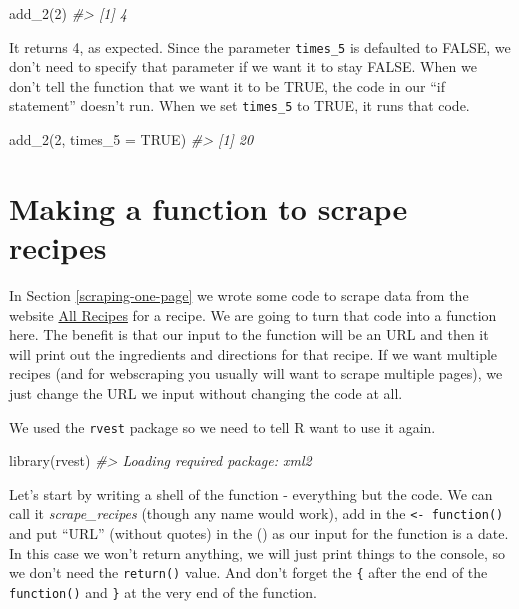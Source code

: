 \documentclass[
  12pt,
]{book}
\newenvironment{Shaded}{\begin{snugshade}}{\end{snugshade}}
\newcommand{\AttributeTok}[1]{\textcolor[rgb]{0.61,0.61,0.61}{#1}}
\newcommand{\CommentTok}[1]{\textcolor[rgb]{0.37,0.37,0.37}{\textit{#1}}}
\newcommand{\ConstantTok}[1]{\textcolor[rgb]{0,0,0}{#1}}
\newcommand{\DecValTok}[1]{\textcolor[rgb]{0.06,0.06,0.06}{#1}}
\newcommand{\FunctionTok}[1]{\textcolor[rgb]{0,0,0}{#1}}
\newcommand{\NormalTok}[1]{#1}
\begin{document}
\begin{Shaded}
\begin{Highlighting}[]
\FunctionTok{add\_2}\NormalTok{(}\DecValTok{2}\NormalTok{)}
\CommentTok{\#\textgreater{} [1] 4}
\end{Highlighting}
\end{Shaded}

It returns 4, as expected. Since the parameter \texttt{times\_5} is defaulted to FALSE, we don't need to specify that parameter if we want it to stay FALSE. When we don't tell the function that we want it to be TRUE, the code in our ``if statement'' doesn't run. When we set \texttt{times\_5} to TRUE, it runs that code.

\begin{Shaded}
\begin{Highlighting}[]
\FunctionTok{add\_2}\NormalTok{(}\DecValTok{2}\NormalTok{, }\AttributeTok{times\_5 =} \ConstantTok{TRUE}\NormalTok{)}
\CommentTok{\#\textgreater{} [1] 20}
\end{Highlighting}
\end{Shaded}

\hypertarget{recipes-function}{%
\section{Making a function to scrape recipes}\label{recipes-function}}

In Section \ref{scraping-one-page} we wrote some code to scrape data from the website \href{https://www.allrecipes.com/}{All Recipes} for a recipe. We are going to turn that code into a function here. The benefit is that our input to the function will be an URL and then it will print out the ingredients and directions for that recipe. If we want multiple recipes (and for webscraping you usually will want to scrape multiple pages), we just change the URL we input without changing the code at all.

We used the \texttt{rvest} package so we need to tell R want to use it again.

\begin{Shaded}
\begin{Highlighting}[]
\FunctionTok{library}\NormalTok{(rvest)}
\CommentTok{\#\textgreater{} Loading required package: xml2}
\end{Highlighting}
\end{Shaded}

Let's start by writing a shell of the function - everything but the code. We can call it \emph{scrape\_recipes} (though any name would work), add in the \texttt{\textless{}-\ function()} and put ``URL'' (without quotes) in the () as our input for the function is a date. In this case we won't return anything, we will just print things to the console, so we don't need the \texttt{return()} value. And don't forget the \texttt{\{} after the end of the \texttt{function()} and \texttt{\}} at the very end of the function.
\end{document}
